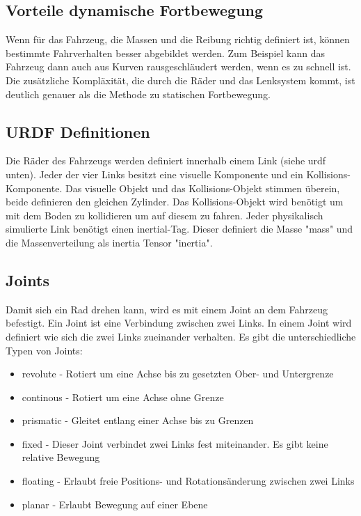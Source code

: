 \subsection*{Vorteile dynamische Fortbewegung}
Wenn für das Fahrzeug, die Massen und die Reibung richtig definiert ist, können bestimmte Fahrverhalten besser abgebildet werden.
Zum Beispiel kann das Fahrzeug dann auch aus Kurven rausgeschläudert werden, wenn es zu schnell ist.
Die zusätzliche Kompläxität, die durch die Räder und das Lenksystem kommt, ist deutlich genauer als die Methode zu statischen Fortbewegung.

\subsection*{URDF Definitionen}
Die Räder des Fahrzeugs werden definiert innerhalb einem Link (siehe urdf unten).
Jeder der vier Links besitzt eine visuelle Komponente und ein Kollisions-Komponente.
Das visuelle Objekt und das Kollisions-Objekt stimmen überein, beide definieren den gleichen Zylinder.
Das Kollisions-Objekt wird benötigt um mit dem Boden zu kollidieren um auf diesem zu fahren.
Jeder physikalisch simulierte Link benötigt einen inertial-Tag.
Dieser definiert die Masse "mass" und die Massenverteilung als inertia Tensor "inertia".

\subsection*{Joints}
Damit sich ein Rad drehen kann, wird es mit einem Joint an dem Fahrzeug befestigt.
Ein Joint ist eine Verbindung zwischen zwei Links. 
In einem Joint wird definiert wie sich die zwei Links zueinander verhalten.
Es gibt die unterschiedliche Typen von Joints:
\begin{itemize}
    \item revolute - Rotiert um eine Achse bis zu gesetzten Ober- und Untergrenze
    \item continous - Rotiert um eine Achse ohne Grenze
    \item prismatic - Gleitet entlang einer Achse bis zu Grenzen
    \item fixed - Dieser Joint verbindet zwei Links fest miteinander. Es gibt keine relative Bewegung
    \item floating - Erlaubt freie Positions- und Rotationsänderung zwischen zwei Links
    \item planar - Erlaubt Bewegung auf einer Ebene
\end{itemize}
\cite{Joint}

